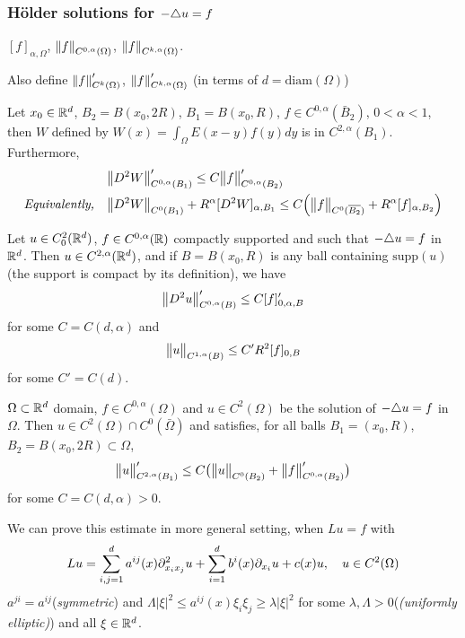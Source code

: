 \documentclass[10pt,a4paper]{article}
\begin{document}
\subsubsection*{H\"{o}lder solutions for $-\triangle u =f$}

 $[f]_{\alpha, \Omega}$, $\snorms{f}{C^{0, \alpha}(\Omega)}$, $\snorms{f}{C^{k, \alpha}(\Omega)}$.

\quad Also define $\snorms{f}{C^k(\Omega)}'$, $\snorms{f}{C^{k, \alpha}(\Omega)}'$ (in terms of $d = \text{diam}(\Omega)$)
\s

 Let $x_0\in \mathbb{R}^d$, $B_2 = B(x_0, 2R)$, $B_1=B(x_0, R)$, $f\in C^{0, \alpha}(\bar{B}_2)$, $0<\alpha<1$, then $W$ defined by $W(x) = \int_{\Omega} E(x-y) f(y)dy$ is in $C^{2,\alpha}(B_1)$. Furthermore,
\begin{align*}
&\bigl\lVert D^2 W\bigr\rVert_{C^{0, \alpha}(B_1)}' \leq C \bigl\lVert f\bigr\rVert_{C^{0, \alpha}(B_2)}' \\
\textit{Equivalently,} \quad &\bigl\lVert D^2 W\bigr\rVert_{C^0(B_1)} +R^{\alpha}[D^2 W]_{\alpha, B_1} \leq C \Big( \bigl\lVert f\bigr\rVert_{C^0(\overline{B_2})} + R^{\alpha}[f]_{\alpha, B_2} \Big)
\end{align*}
\s

 Let $u\in C^2_0(\mathbb{R}^d)$, $f\in C^{0, \alpha}(\mathbb{R})$ compactly supported and such that $-\triangle u = f$ in $\mathbb{R}^d$. Then $u\in C^{2, \alpha}(\mathbb{R}^d)$, and if $B= B(x_0, R)$ is any ball containing $\text{supp}(u)$ (the support is compact by its definition), we have
\begin{align*}
\bigl\lVert D^2 u\bigr\rVert_{C^{0, \alpha}(B)}' \leq C [f]_{0, \alpha, B}'
\end{align*}
for some $C =C(d, \alpha)$ and
\begin{align*}
\bigl\lVert u\bigr\rVert_{C^{1,\alpha}(B)}\leq C' R^2 [f]_{0, B}
\end{align*}
for some $C' = C(d)$.
\s

 $\Omega \subset \mathbb{R}^d$ domain, $f\in C^{0, \alpha}(\Omega)$ and $u\in C^2(\Omega)$ be the solution of $-\triangle u =f$ in $\Omega$. Then $u\in C^2(\Omega) \cap C^0(\bar{\Omega})$ and satisfies, for all balls $B_1 = (x_0, R)$, $B_2= B(x_0, 2R) \subset \Omega$,
\begin{align*}
\bigl\lVert u\bigr\rVert_{C^{2, \alpha}(B_1)}' \leq C \big(\bigl\lVert u\bigr\rVert_{C^0(B_2)} + \bigl\lVert f\bigr\rVert_{C^{0,\alpha}(B_2)}' \big) 
\end{align*}
for some $C =C(d, \alpha)>0$.
\s

We can prove this estimate in more general setting, when $Lu =f$ with
\begin{align*}
Lu = \sum_{i,j=1}^d a^{ij}(x) \partial^2_{x_i x_j} u + \sum_{i=1}^d b^i(x) \partial_{x_i} u + c(x)u, \quad u\in C^2(\Omega)
\end{align*}
$a^{ji} = a^{ij}$(\emph{symmetric}) and $\Lambda |\xi|^2 \leq a^{ij}(x) \xi_i \xi_j \geq \lambda |\xi|^2$ for some $\lambda, \Lambda >0$(\emph{(uniformly elliptic)}) and all $\xi \in \mathbb{R}^d$.
\s
\end{document}
